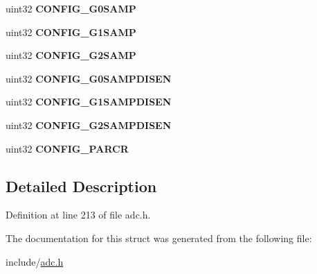 \begin{DoxyCompactItemize}
\mbox{\label{structadc__config__reg_ab0c2e5b0bca3504af600d52a3eb63228}} 
uint32 {\bfseries C\+O\+N\+F\+I\+G\+\_\+\+G0\+S\+A\+MP}
\item 
\mbox{\label{structadc__config__reg_aa01bc613f6c03ed14158badb8eced76b}} 
uint32 {\bfseries C\+O\+N\+F\+I\+G\+\_\+\+G1\+S\+A\+MP}
\item 
\mbox{\label{structadc__config__reg_afe7eb2e261f5980c176d847b91245d5f}} 
uint32 {\bfseries C\+O\+N\+F\+I\+G\+\_\+\+G2\+S\+A\+MP}
\item 
\mbox{\label{structadc__config__reg_a3aca55ca19b15410c7dda8a589df9392}} 
uint32 {\bfseries C\+O\+N\+F\+I\+G\+\_\+\+G0\+S\+A\+M\+P\+D\+I\+S\+EN}
\item 
\mbox{\label{structadc__config__reg_a9816a5959de1d8cc5995af0c4e6f7e2d}} 
uint32 {\bfseries C\+O\+N\+F\+I\+G\+\_\+\+G1\+S\+A\+M\+P\+D\+I\+S\+EN}
\item 
\mbox{\label{structadc__config__reg_a85d3c454498f182184356c855f283002}} 
uint32 {\bfseries C\+O\+N\+F\+I\+G\+\_\+\+G2\+S\+A\+M\+P\+D\+I\+S\+EN}
\item 
\mbox{\label{structadc__config__reg_a252fc178fccada2cf114edea35e6bd2f}} 
uint32 {\bfseries C\+O\+N\+F\+I\+G\+\_\+\+P\+A\+R\+CR}
\end{DoxyCompactItemize}


\subsection{Detailed Description}


Definition at line 213 of file adc.\+h.



The documentation for this struct was generated from the following file\+:\begin{DoxyCompactItemize}
\item 
include/\mbox{\hyperlink{adc_8h}{adc.\+h}}\end{DoxyCompactItemize}
